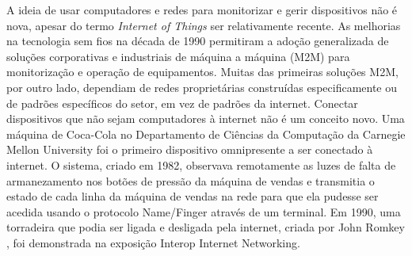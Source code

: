\documentclass[conference]{IEEEtran}
\begin{document}

A ideia de usar computadores e redes para monitorizar e gerir dispositivos não
é nova, apesar do termo \textit{Internet of Things} ser relativamente recente.
As melhorias na tecnologia sem fios na década de 1990 permitiram a adoção
generalizada de soluções corporativas e industriais de máquina a máquina (M2M)
para monitorização e operação de equipamentos. Muitas das primeiras soluções
M2M, por outro lado, dependiam de redes proprietárias construídas especificamente
ou de padrões específicos do setor, em vez de padrões da internet. Conectar
dispositivos que não sejam computadores à internet não é um conceito novo.
Uma máquina de Coca-Cola no Departamento de Ciências da Computação da Carnegie
Mellon University \cite{EverhartInteresting} foi o primeiro dispositivo
omnipresente a ser conectado à internet. O sistema, criado em 1982, observava
remotamente as luzes de falta de armanezamento nos botões de pressão da máquina
de vendas e transmitia o estado de cada linha da máquina de vendas na rede para
que ela pudesse ser acedida usando o protocolo Name/Finger através de um
terminal. Em 1990, uma torradeira que podia ser ligada e desligada pela
internet, criada por John Romkey \cite{RomkeyToast}, foi demonstrada na
exposição Interop Internet Networking.
\end{document}
